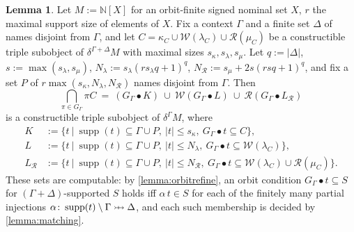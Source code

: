 \documentclass{article}
\theoremstyle{definition}
\newtheorem{lemma}{Lemma}[section]
\newcommand{\prightarrowtail}{\mathrel{\ooalign{\hfil$\mapstochar\mkern5mu$\hfil\cr$\rightarrowtail$\cr}}}
\newcommand{\N}{\mathbb{N}}
\newcommand{\cR}{\mathcal{R}}
\newcommand{\cW}{\mathcal{W}}
\newcommand{\supp}{\operatorname{supp}}
\begin{document}
\begin{lemma}
    \label{lemma:tripleintersect}
    Let $M:=\N[X]$ for an orbit-finite signed nominal set $X$, $r$ the maximal support size of elements of $X$. Fix a context $\Gamma$ and a finite set $\Delta$ of names disjoint from $\Gamma$, and let $C=\kappa_C\cup\cW(\lambda_C)\cup\cR(\mu_C)$ be a constructible triple subobject of $\delta^{\Gamma+\Delta}M$ with maximal sizes $s_\kappa,s_\lambda,s_\mu$. Let $q:=|\Delta|$, $s:=\max(s_\lambda,s_\mu)$, $N_\lambda:=s_\lambda(rs_\lambda q+1)^q$, $N_\cR:=s_\mu+2s(rsq+1)^q$, and fix a set $P$ of $r\max(s_\kappa,N_\lambda,N_\cR)$ names disjoint from $\Gamma$. Then
    $$\bigcap_{\pi\in G_\Gamma}\pi C\ =\ (G_\Gamma\bullet K)\ \cup\ \cW(G_\Gamma\bullet L)\ \cup\ \cR(G_\Gamma\bullet L_\cR)$$
    is a constructible triple subobject of $\delta^\Gamma M$, where
    \begin{align*}
    K&:=\{t\ |\ \supp(t)\subseteq\Gamma\cup P,\ |t|\leq s_\kappa,\ G_\Gamma\bullet t\subseteq C\},\\
    L&:=\{t\ |\ \supp(t)\subseteq\Gamma\cup P,\ |t|\leq N_\lambda,\ G_\Gamma\bullet t\subseteq\cW(\lambda_C)\},\\
    L_\cR&:=\{t\ |\ \supp(t)\subseteq\Gamma\cup P,\ |t|\leq N_\cR,\ G_\Gamma\bullet t\subseteq\cW(\lambda_C)\cup\cR(\mu_C)\}.
    \end{align*}
    These sets are computable: by \cref{lemma:orbitrefine}, an orbit condition $G_\Gamma\bullet t\subseteq S$ for $(\Gamma+\Delta)$-supported $S$ holds iff $\alpha\,t\in S$ for each of the finitely many partial injections $\alpha\colon\supp(t)\setminus\Gamma\prightarrowtail\Delta$, and each such membership is decided by \cref{lemma:matching}.
\end{lemma}
\end{document}
